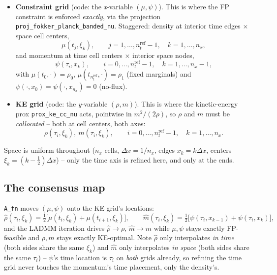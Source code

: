 \documentclass[11pt]{article}
\newcommand{\dx}{\Delta x}
\newcommand{\code}[1]{\texttt{#1}}
\begin{document}
\begin{itemize}
  \item \textbf{Constraint grid} (code: the \emph{x}-variable $(\mu,\psi)$). This is
        where the FP constraint is enforced \emph{exactly}, via the projection
        \code{proj\_fokker\_planck\_banded\_nu}. Staggered: density at interior time
        edges $\times$ space cell centers,
        \[
          \mu(t_j,\xi_k), \qquad j=1,\ldots,n_t^{\mathrm{ref}}-1,\quad k=1,\ldots,n_x,
        \]
        and momentum at time cell centers $\times$ interior space nodes,
        \[
          \psi(\tau_i,x_k), \qquad i=0,\ldots,n_t^{\mathrm{ref}}-1,\quad k=1,\ldots,n_x-1,
        \]
        with $\mu(t_0,\cdot)=\rho_0$, $\mu(t_{n_t^{\mathrm{ref}}},\cdot)=\rho_1$ (fixed
        marginals) and $\psi(\cdot,x_0)=\psi(\cdot,x_{n_x})=0$ (no-flux).
  \item \textbf{KE grid} (code: the \emph{y}-variable $(\rho,m)$). This is where the
        kinetic-energy prox \code{prox\_ke\_cc\_nu} acts, pointwise in $m^2/(2\rho)$, so
        $\rho$ and $m$ must be \emph{collocated} -- both at cell centers, both axes:
        \[
          \rho(\tau_i,\xi_k),\ m(\tau_i,\xi_k), \qquad i=0,\ldots,n_t^{\mathrm{ref}}-1,\quad
          k=1,\ldots,n_x.
        \]
\end{itemize}
Space is uniform throughout ($n_x$ cells, $\dx=1/n_x$, edges $x_k=k\dx$, centers
$\xi_k=(k-\tfrac12)\dx$) -- only the time axis is refined here, and only at the ends.

\subsection*{The consensus map}

\code{A\_fn} moves $(\mu,\psi)$ onto the KE grid's locations:
\begin{equation}
  \label{eq:consensus}
  \hat\rho(\tau_i,\xi_k) = \tfrac12\bigl[\mu(t_i,\xi_k)+\mu(t_{i+1},\xi_k)\bigr],
  \qquad
  \hat m(\tau_i,\xi_k) = \tfrac12\bigl[\psi(\tau_i,x_{k-1})+\psi(\tau_i,x_k)\bigr],
\end{equation}
and the LADMM iteration drives $\hat\rho\to\rho$, $\hat m\to m$ while $\mu,\psi$ stays
exactly FP-feasible and $\rho,m$ stays exactly KE-optimal. Note $\hat\rho$ only
interpolates \emph{in time} (both sides share the same $\xi_k$) and $\hat m$ only
interpolates \emph{in space} (both sides share the same $\tau_i$) -- $\psi$'s time
location is $\tau_i$ on \emph{both} grids already, so refining the time grid never
touches the momentum's time placement, only the density's.
\end{document}
